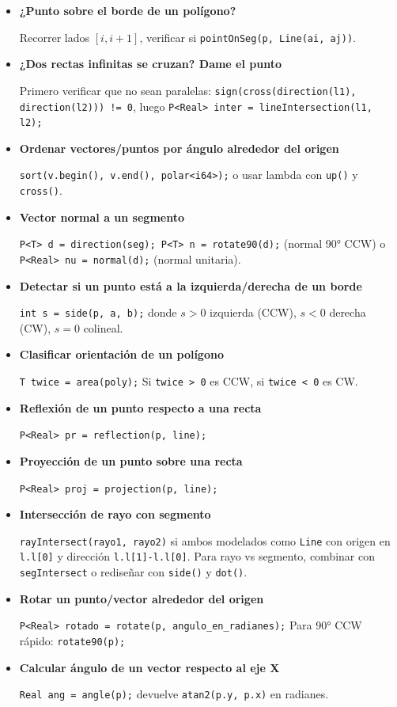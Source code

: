 \begin{itemize}
    \item \textbf{¿Punto sobre el borde de un polígono?}
    
    Recorrer lados $[i, i+1]$, verificar si \texttt{pointOnSeg(p, Line(ai, aj))}.
    
    \item \textbf{¿Dos rectas infinitas se cruzan? Dame el punto}
    
    Primero verificar que no sean paralelas: \texttt{sign(cross(direction(l1), direction(l2))) != 0}, luego \texttt{P<Real> inter = lineIntersection(l1, l2);}
    
    \item \textbf{Ordenar vectores/puntos por ángulo alrededor del origen}
    
    \texttt{sort(v.begin(), v.end(), polar<i64>);} o usar lambda con \texttt{up()} y \texttt{cross()}.
    
    \item \textbf{Vector normal a un segmento}
    
    \texttt{P<T> d = direction(seg); P<T> n = rotate90(d);} (normal 90° CCW) o \texttt{P<Real> nu = normal(d);} (normal unitaria).
    
    \item \textbf{Detectar si un punto está a la izquierda/derecha de un borde}
    
    \texttt{int s = side(p, a, b);} donde $s > 0$ izquierda (CCW), $s < 0$ derecha (CW), $s = 0$ colineal.
    
    \item \textbf{Clasificar orientación de un polígono}
    
    \texttt{T twice = area(poly);} Si \texttt{twice > 0} es CCW, si \texttt{twice < 0} es CW.
    
    \item \textbf{Reflexión de un punto respecto a una recta}
    
    \texttt{P<Real> pr = reflection(p, line);}
    
    \item \textbf{Proyección de un punto sobre una recta}
    
    \texttt{P<Real> proj = projection(p, line);}
    
    \item \textbf{Intersección de rayo con segmento}
    
    \texttt{rayIntersect(rayo1, rayo2)} si ambos modelados como \texttt{Line} con origen en \texttt{l.l[0]} y dirección \texttt{l.l[1]-l.l[0]}. Para rayo vs segmento, combinar con \texttt{segIntersect} o rediseñar con \texttt{side()} y \texttt{dot()}.
    
    \item \textbf{Rotar un punto/vector alrededor del origen}
    
    \texttt{P<Real> rotado = rotate(p, angulo\_en\_radianes);} Para 90° CCW rápido: \texttt{rotate90(p);}
    
    \item \textbf{Calcular ángulo de un vector respecto al eje X}
    
    \texttt{Real ang = angle(p);} devuelve \texttt{atan2(p.y, p.x)} en radianes.
\end{itemize}

